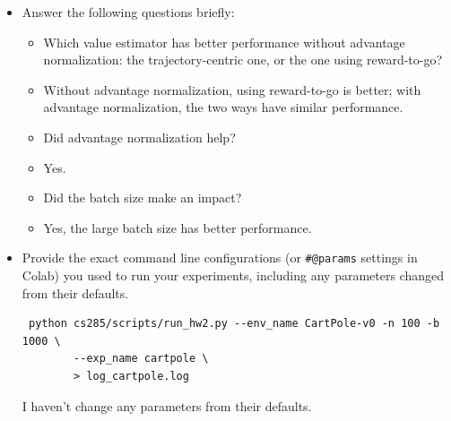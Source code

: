 \documentclass{article}
\begin{document}
\begin{itemize}
\item Answer the following questions briefly: 
\begin{itemize}
\item Which value estimator has better performance without advantage normalization: the trajectory-centric one, or the one using reward-to-go?
\item \MYSOLUTION Without advantage normalization, using reward-to-go is better; with advantage normalization, the two ways have similar performance.
\item Did advantage normalization help?
\item \MYSOLUTION Yes.
\item Did the batch size make an impact?
\item \MYSOLUTION Yes, the large batch size has better performance.
\end{itemize}
\item Provide the exact command line configurations (or \texttt{\#@params} settings in Colab) you used to run your experiments, including any parameters changed from their defaults.

\MYSOLUTION 
\begin{verbatim}
 python cs285/scripts/run_hw2.py --env_name CartPole-v0 -n 100 -b 1000 \
        --exp_name cartpole \
        > log_cartpole.log
\end{verbatim}

I haven't change any parameters from their defaults.

\end{itemize}
\end{document}
